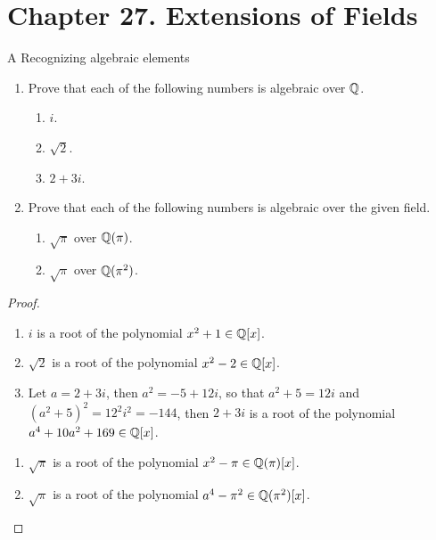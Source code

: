 \section*{Chapter 27. Extensions of Fields}


\begin{exercise}{A Recognizing algebraic elements}
\begin{enumerate}
    \item Prove that each of the following numbers is algebraic over $\mathbb{Q}$.
    \begin{enumerate}
        \item  $i$.
        \item $\sqrt{2}$.
        \item $2+3i$.
    \end{enumerate}
    \item Prove that each of the following numbers is algebraic over the given field.
    \begin{enumerate}
        \item $\sqrt{\pi}$ over $\mathbb{Q}(\pi)$.
        \item $\sqrt{\pi}$ over $\mathbb{Q}(\pi^2)$.
    \end{enumerate}
\end{enumerate}
\end{exercise}
\begin{proof}
 \begin{enumerate}
     \begin{enumerate}
         \item $i$ is a root of the polynomial $x^2+1\in\mathbb{Q}[x]$.
         \item $\sqrt{2}$ is a root of the polynomial $x^2-2\in\mathbb{Q}[x]$.
         \item Let $a=2+3i$, then $a^2=-5+12i$, so that $a^2+5=12i$ and $(a^2+5)^2=12^2i^2=-144$, then $2+3i$ is a root of the polynomial $a^4+10a^2+169\in\mathbb{Q}[x]$.
     \end{enumerate}
     \begin{enumerate}
         \item $\sqrt{\pi}$ is a root of the polynomial $x^2-\pi\in\mathbb{Q}(\pi)[x]$.
         \item $\sqrt{\pi}$ is a root of the polynomial $a^4-\pi^2\in\mathbb{Q}(\pi^2)[x]$.
     \end{enumerate}
 \end{enumerate}
\end{proof}

